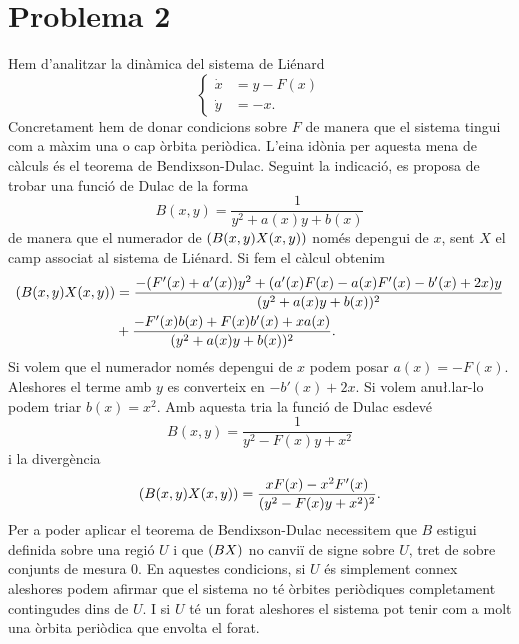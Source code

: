 \documentclass[12pt]{article}
\numberwithin{table}{section}
\numberwithin{equation}{section}
\numberwithin{figure}{section}
\let\div\relax
\DeclareMathOperator{\div}{div}
\begin{document}
\section*{Problema 2}
Hem d'analitzar la dinàmica del sistema de Liénard
\begin{equation} \label{eqn:sistema lienard}
	\left\{
		\begin{aligned}
			\dot{x} &= y - F(x) \\
			\dot{y} &= -x.
		\end{aligned}
	\right.
\end{equation}
Concretament hem de donar condicions sobre \( F \) de manera que el sistema tingui com a màxim una o cap òrbita periòdica. L'eina idònia per aquesta mena de càlculs és el teorema de Bendixson-Dulac. Seguint la indicació, es proposa de trobar una funció de Dulac de la forma
\begin{equation*}
    B(x,y) = \frac{1}{y^2 + a(x)y + b(x)}
\end{equation*}
de manera que el numerador de \( \div{(B(x,y)X(x,y))} \) només depengui de \( x \), sent \( X \) el camp associat al sistema de Liénard. Si fem el càlcul obtenim
\begin{align*}
    \div{(B(x,y)X(x,y))} &= \frac{-(F'(x) + a'(x))y^2 + (a'(x)F(x) - a(x)F'(x) - b'(x) + 2x)y }{(y^2 + a(x)y + b(x))^2} \\
    &+ \frac{- F'(x)b(x) + F(x)b'(x) + xa(x)}{(y^2 + a(x)y + b(x))^2}.
\end{align*}
Si volem que el numerador només depengui de \( x \) podem posar \( a(x) = -F(x) \). Aleshores el terme amb \( y \) es converteix en \( -b'(x) + 2x \). Si volem anu\l.lar-lo podem triar \( b(x) = x^2 \). Amb aquesta tria la funció de Dulac esdevé
\begin{equation*}
    B(x,y) = \frac{1}{y^2 - F(x)y + x^2}
\end{equation*}
i la divergència
\begin{equation*}
    \div{(B(x,y)X(x,y))} = \frac{xF(x) - x^2 F'(x)}{(y^2 - F(x)y + x^2)^2}.
\end{equation*}
Per a poder aplicar el teorema de Bendixson-Dulac necessitem que \( B \) estigui definida sobre una regió \( U \) i que \( \div{(BX)} \) no canviï de signe sobre \( U \), tret de sobre conjunts de mesura 0. En aquestes condicions, si \( U \) és simplement connex aleshores podem afirmar que el sistema no té òrbites periòdiques completament contingudes dins de \( U \). I si \( U \) té un forat aleshores el sistema pot tenir com a molt una òrbita periòdica que envolta el forat.
\end{document}
